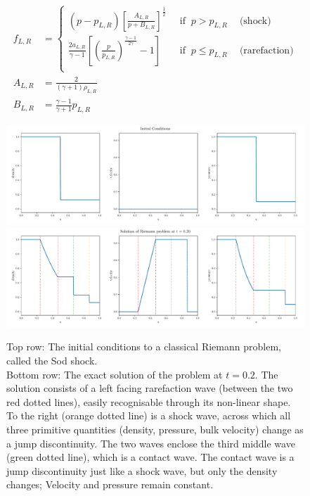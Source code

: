 \begin{align}
f_{L,R} &=
	\begin{cases}
		(p - p_{L,R}) \left[ \frac{A_{L,R}}{p + B_{L,R}}
\right]^{\frac{1}{2}}
			& ~\text{ if } ~ p > p_{L,R} ~ \quad \text{(shock)} \\
		\frac{2 a_{L,R}}{\gamma - 1} \left[ \left( \frac{p}{p_{L,R}}
\right)^ \frac{\gamma -1}{2 \gamma} - 1 \right]
			& ~\text{ if } ~ p \leq p_{L,R} ~ \quad \text{(rarefaction)}
\label{eq:riemann-pstar}\\
	\end{cases} \\
A_{L,R} &=
	\frac{2}{(\gamma + 1) \rho_{L,R}}\\
B_{L,R} &=
	\frac{\gamma - 1}{\gamma + 1} p_{L,R}
\end{align}












\begin{figure}
	\centering
	\includegraphics[width=.9\textwidth]{./figures/riemann_IC.pdf}%
	\\
	\includegraphics[width=.9\textwidth]{./figures/riemann_exact_solution.pdf}%
	\caption{
Top row: The initial conditions to a classical Riemann problem, called the Sod
shock.\\
%
Bottom row: The exact solution of the problem at $t = 0.2$. The solution
consists of a left facing rarefaction wave (between the two red dotted lines),
easily recognisable through its non-linear shape. To the right (orange dotted
line) is a shock wave, across which all three primitive quantities (density,
pressure, bulk velocity) change as a jump discontinuity. The two waves enclose
the third middle wave (green dotted line), which is a contact wave. The contact
wave is a jump discontinuity just like a shock wave, but only the density
changes; Velocity and pressure remain constant.
\label{fig:riemann-solved}
		}%
\end{figure}















